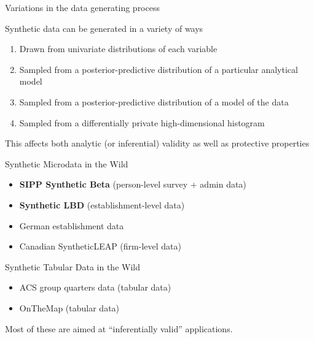 \begin{frame}{Variations in the data generating process}
	\begin{block}{Synthetic data can be generated in a variety of ways}
		\begin{enumerate}
			\item Drawn from univariate distributions of each variable
			\item Sampled from a posterior-predictive distribution of a particular analytical model
			\item Sampled from a posterior-predictive distribution of a model of the data 
			\item Sampled from a differentially private high-dimensional histogram
		\end{enumerate}
	This affects both analytic (or inferential) validity as well as protective properties
	\end{block}
\end{frame}


\begin{frame}{Synthetic Microdata in the Wild}
	\begin{block}{}
		\begin{itemize}
			\item \textbf{SIPP Synthetic Beta} (person-level survey + admin data) \citep{ssafinal,CreationSSBv7}
			\item \textbf{Synthetic LBD} (establishment-level data) \citep{KinneyEtAl2011}
			\item German establishment data \citep{drechsler2012}
			\item Canadian SyntheticLEAP (firm-level data) \citep{alam2020a}
		\end{itemize}
	\end{block}
\end{frame}


\begin{frame}
	\begin{block}{Synthetic Tabular Data in the Wild}
		\begin{itemize}
			\item ACS group quarters data (tabular data)
			\item OnTheMap (tabular data) \citep{Ashwin2008}
		\end{itemize}
	\end{block}
Most of these are aimed at ``inferentially valid'' applications.
\end{frame}

